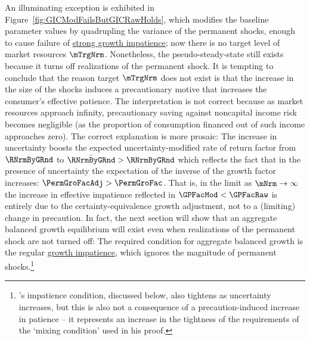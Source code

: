 \documentclass[BufferStockTheory]{subfiles}
\begin{document}
An illuminating exception is exhibited in Figure~\ref{fig:GICModFailsButGICRawHolds}, which modifies the baseline parameter values by quadrupling the variance of the permanent shocks, enough to cause failure of \hyperlink{GICMod}{strong growth impatience}; now there is no target level of market resources $\mTrgNrm$.
Nonetheless, the pseudo-steady-state still exists because it turns off realizations of the permanent shock.
It is tempting to conclude that the reason target $\mTrgNrm$ does not exist is that the increase in the size of the shocks induces a precautionary motive that increases the consumer's effective patience.
The interpretation is not correct because as market resources approach infinity, precautionary saving against noncapital income risk becomes negligible (as the proportion of consumption financed out of such income approaches zero).
The correct explanation is more prosaic: The increase in uncertainty boosts the expected uncertainty-modified rate of return factor from $\RNrmByGRnd$ to $\bar{\RNrmByGRnd}>\RNrmByGRnd$ which reflects the fact that in the presence of uncertainty the expectation of the inverse of the growth factor increases: $\PermGroFacAdj > \PermGroFac$.
That is, in the limit as $\mNrm \rightarrow \infty$ the increase in effective impatience reflected in $\GPFacMod < \GPFacRaw$ is entirely due to the certainty-equivalence growth adjustment, not to a (limiting) change in precaution.
In fact, the next section will show that an aggregate balanced growth equilibrium will exist even when realizations of the permanent shock are not turned off: The required condition for aggregate balanced growth is the regular \hyperlink{GIC}{growth impatience}, which ignores the magnitude of permanent shocks.\footnote{\cite{szeidlInvariant}'s impatience condition, discussed below, also tightens as uncertainty increases, but this is also not a consequence of a precaution-induced increase in patience -- it represents an increase in the tightness of the requirements of the `mixing condition' used in his proof.}

\begin{comment}
again, removed FHWC above since GIC holds.
double check.

\end{comment}
\end{document}
